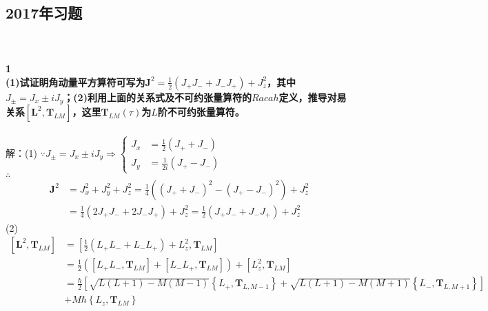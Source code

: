 \documentclass[12pt]{article}
\numberwithin{equation}{section}	 %
\begin{document}
\begin{spacing}{1.5}
\subsection{2017年习题}
~\\
~\\
\textbf{1 \quad \\
(1)试证眀角动量平方算符可写为$\displaystyle \bm{J}^{2}=\frac{1}{2}(J_{+}J_{-}+J_{-}J_{+})+J_{z}^{2}$，其中$J_{\pm}=J_{x}\pm iJ_{y}$；(2)利用上面的关系式及不可约张量算符的$Racah$定义，推导对易关系$\displaystyle \left[ \bm{L}^{2}, \bm{T}_{LM}\right]$，这里$\bm{T}_{LM}(\tau)$为$L$阶不可约张量算符。}\\
~\\
解：(1) $\because J_{\pm}=J_{x}\pm iJ_{y} \Rightarrow \left\{ \begin{aligned}
J_{x} &= \frac{1}{2}(J_{+}+J_{-}) \\ J_{y} &= \frac{1}{2i}(J_{+}-J_{-})
\end{aligned} \right. $ \\
$\therefore$
\begin{equation}
\begin{aligned}
\bm{J}^{2} &= J_{x}^{2}+J_{y}^{2}+J_{z}^{2} = \frac{1}{4}\left((J_{+}+J_{-})^{2}-(J_{+}-J_{-})^{2}\right)+J_{z}^{2} \\
&=\frac{1}{4}(2J_{+}J_{-}+2J_{-}J_{+})+J_{z}^{2} = \frac{1}{2}(J_{+}J_{-}+J_{-}J_{+})+J_{z}^{2}
\end{aligned}
\end{equation}
(2) 
\begin{align*}
\left[\bm{L}^{2}, \bm{T}_{LM}\right] &= \left[\frac{1}{2}\left(L_{+}L_{-}+L_{-}L_{+}\right)+L_{z}^{2},\bm{T}_{LM}\right]\\
&= \frac{1}{2} \left(\left[L_{+}L_{-},\bm{T}_{LM}\right]+\left[L_{-}L_{+},\bm{T}_{LM}\right]\right) + \left[L_{z}^{2},\bm{T}_{LM}\right] \\
&= \frac{\hbar}{2}\left[ \sqrt{L(L+1)-M(M-1)}\left\{L_{+},\bm{T}_{L,M-1}\right\} + \sqrt{L(L+1)-M(M+1)}\left\{L_{-},\bm{T}_{L,M+1}\right\} \right] \\ &+ M\hbar\left\{L_{z},\bm{T}_{LM}\right\} 
\end{align*}
~\\
~\\



\end{spacing}
\end{document}
